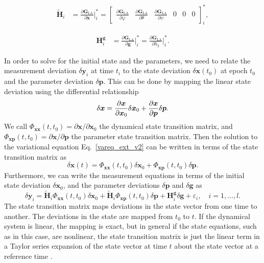 \documentclass[pdflatex,sn-mathphys-num]{sn-jnl}%
\theoremstyle{thmstyleone}%
\theoremstyle{thmstyletwo}%
\theoremstyle{thmstylethree}%
\renewcommand{\vec}[1]{\boldsymbol{#1}}
\begin{document}
	
\begin{align}
	\tilde{\vec{H}}_i
	&= \frac{\partial \vec{G}_{\mathrm{LA}}}{\partial \vec{x}} \bigg|^*_i= %
		\begin{bmatrix}
				\frac{\partial \vec{G}_{\mathrm{LA}}}{\partial \varphi} &
				\frac{\partial \vec{G}_{\mathrm{LA}}}{\partial \theta} &
				\frac{\partial \vec{G}_{\mathrm{LA}}}{\partial \psi}&
				0 &0  &0
		\end{bmatrix}_i^*,
\end{align}

	
\begin{align}
		\vec{H}^{\vec{g}}_i & = \frac{\partial \vec{G}_{\mathrm{LA}}}{\partial \vec{g}} \bigg|^*_i=
		\frac{\partial \vec{G}_{\mathrm{LA}}}{\partial h_2} \bigg|^*_i.
\end{align}


	
	
	In order to solve for the initial state and the parameters, we need to relate the measurement deviation \( \delta \vec{y}_i \) at time \( t_i \) to the state deviation \( \delta \vec{x}(t_0)\) at epoch \( t_0 \) and the parameter deviation \( \delta \vec{p} \). This can be done by mapping the linear state deviation using the differential relationship
	\begin{equation}
	\delta \vec{x} = \pdv{\vec{x}}{\vec{x}_0} \delta \vec{x}_0 + \pdv{\vec{x}}{\vec{p}} \delta \vec{p}.
	\end{equation}
	We call $\Phi_{\vec{xx}}(t, t_0) = \partial\vec{x}/\partial\vec{x}_0$ the dynamical state transition matrix, and $\Phi_{\vec{xp}}(t, t_0) = \partial\vec{x} /\partial \vec{p}$ the parameter state transition matrix.
	Then the solution to the variational equation Eq.~\eqref{vareq_ext_v2} can be written in terms of the state transition matrix as
	\begin{equation}
		\delta\vec{x}(t) = 
		\Phi_{\vec{xx}}(t, t_0) \delta\vec{x}_0 + 
		\Phi_{\vec{xp}}(t, t_0) \delta\vec{p}.
	\end{equation}
	Furthermore, we can write the measurement equations in terms of the initial state deviation $\delta\vec{x}_0$, and the parameter deviations $\delta\vec{p}$ and $\delta\vec{g}$ as
	\begin{equation}\label{eq:22.23_v2}
		\delta\vec{y}_i = 
		\tilde{\vec{H}}_i	\Phi_{\vec{xx}}(t, t_0) \delta\vec{x}_0 + 
		\tilde{\vec{H}}_i	\Phi_{\vec{xp}}(t, t_0) \delta\vec{p} 
		+ \vec{H}^{\vec{g}}_i \delta\vec{g} 
		+ \varepsilon_i, \quad i = 1, \dots, l.
	\end{equation}
	The state transition matrix maps deviations in the state vector from one time to another.  The deviations in the state are mapped from $t_0$ to $t$. 
	If the dynamical system is linear, the mapping is exact, but in general if  the state equations, such as in this case, are nonlinear,  the state transition matrix is just the linear term in a Taylor series expansion of the state vector at time $t$ about the state vector at a reference time \citep[see, e.g.,][]{2004sod..book.....T}. %
	
\end{document}
